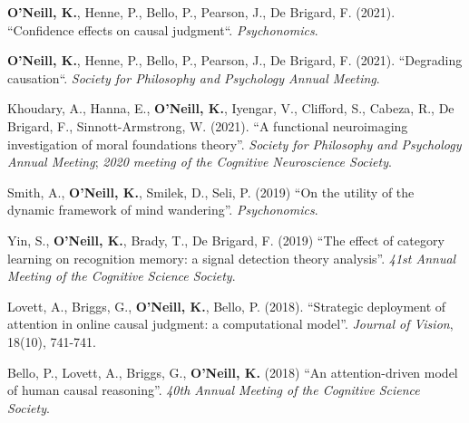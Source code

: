 \textbf{O'Neill, K.}, Henne, P., Bello, P., Pearson, J., De Brigard,
F. (2021). ``Confidence effects on causal
judgment``. \emph{Psychonomics}.

\textbf{O'Neill, K.}, Henne, P., Bello, P., Pearson, J., De Brigard,
F. (2021). ``Degrading causation``. \emph{Society for Philosophy and
Psychology Annual Meeting}.

Khoudary, A., Hanna, E., \textbf{O’Neill, K.}, Iyengar, V., Clifford,
S., Cabeza, R., De Brigard, F., Sinnott-Armstrong, W. (2021). ``A
functional neuroimaging investigation of moral foundations
theory''. \emph{Society for Philosophy and Psychology Annual Meeting};
\emph{2020 meeting of the Cognitive Neuroscience Society}.

Smith, A., \textbf{O'Neill, K.}, Smilek, D., Seli, P. (2019) ``On the
utility of the dynamic framework of mind
wandering''. \emph{Psychonomics}.

Yin, S., \textbf{O'Neill, K.}, Brady, T., De Brigard, F. (2019) ``The
effect of category learning on recognition memory: a signal detection
theory analysis''. \emph{41st Annual Meeting of the Cognitive Science
Society}.

Lovett, A., Briggs, G., \textbf{O'Neill, K.}, Bello,
P. (2018). ``Strategic deployment of attention in online causal
judgment: a computational model''. \emph{Journal of Vision}, 18(10),
741-741.

Bello, P., Lovett, A., Briggs, G., \textbf{O'Neill, K.} (2018) ``An
attention-driven model of human causal reasoning''. \emph{40th Annual
Meeting of the Cognitive Science Society}.
